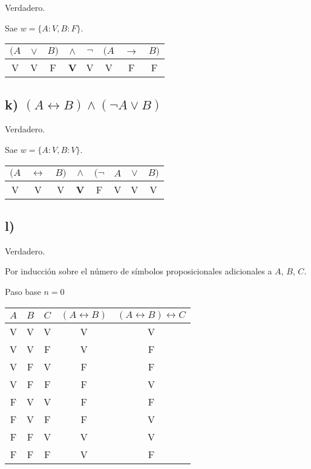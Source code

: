 \documentclass[spanish]{article}
\begin{document}
Verdadero.

Sae $w=\{A:V,B:F\}$.

\begin{tabular}{cccccccc}
  $(A$ & $\vee$ & $B)$ & $\wedge$ & $\neg$ & $(A$ & $\rightarrow$ & $B)$ \\\hline
  V    & V      & F    & \bf V    & V      & V    & F             & F
\end{tabular}



\subsection*{ k) $(A\leftrightarrow B )\wedge (\neg A\vee B)$}
Verdadero.


Sae $w=\{A:V, B:V\}$.

\begin{tabular}{cccccccc}
  $(A$ & $\leftrightarrow$ & $B)$ & $\wedge$ & $(\neg$ & $A$ & $\vee$ & $B)$ \\\hline
  V    & V                 & V    & \bf V    & F       & V   & V      & V    \\
\end{tabular}

\subsection*{ l) }

Verdadero.

Por inducción sobre el número de símbolos proposicionales adicionales a $A$, $B$, $C$.

Paso base $n=0$

\begin{tabular}{c|c|c|c|c}
  $A$ & $B$ & $C$ & $(A\leftrightarrow B)$ & $(A\leftrightarrow B)\leftrightarrow C$ \\\hline
  V   & V   & V   & V                      & V                                       \\
  V   & V   & F   & V                      & F                                       \\
  V   & F   & V   & F                      & F                                       \\
  V   & F   & F   & F                      & V                                       \\
  F   & V   & V   & F                      & F                                       \\
  F   & V   & F   & F                      & V                                       \\
  F   & F   & V   & V                      & V                                       \\
  F   & F   & F   & V                      & F                                       \\
\end{tabular}
\end{document}
